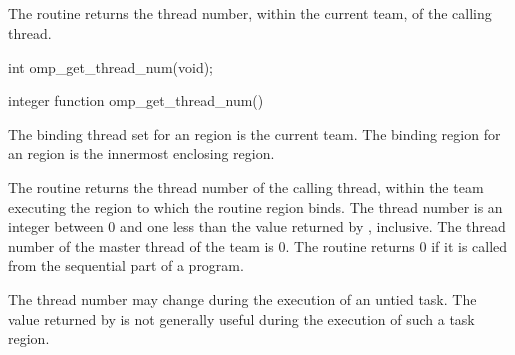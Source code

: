 \subsection{}
\label{subsec:omp_get_thread_num}
\summary
The  routine returns the thread number, within the current
team, of the calling thread.

\format
\begin{ccppspecific}
\begin{ompcFunction}
int omp_get_thread_num(void);
\end{ompcFunction}
\end{ccppspecific}

\begin{fortranspecific}
\begin{ompfFunction}
integer function omp_get_thread_num()
\end{ompfFunction}
\end{fortranspecific}

\binding
The binding thread set for an  region is the current team. The
binding region for an  region is the innermost enclosing
 region.

\effect
The  routine returns the thread number of the calling thread,
within the team executing the  region to which the routine region binds. The
thread number is an integer between 0 and one less than the value returned by
, inclusive. The thread number of the master thread of the
team is 0. The routine returns 0 if it is called from the sequential part of a program.

\begin{note}
The thread number may change during the execution of an untied task. The
value returned by  is not generally useful during the execution
of such a task region.
\end{note}


